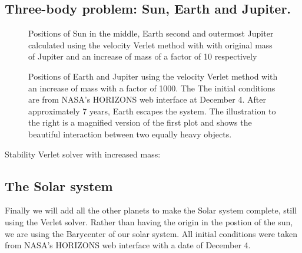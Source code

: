 \documentclass[../main.tex]{subfiles}
\begin{document}
\subsection{Three-body problem: Sun, Earth and Jupiter.}
\begin{figure}[!h]
  \centering
  \caption{Positions of Sun in the middle, Earth second and outermost Jupiter calculated using the velocity Verlet method with with original mass of Jupiter and an increase of mass of a factor of 10 respectively}
  \label{fig:SunEarthJupiter10}
\end{figure}

\begin{figure}[!h]
  \centering
  \caption{Positions of Earth and Jupiter using the velocity Verlet method with an increase of mass with a factor of 1000. The The initial conditions are from NASA's HORIZONS web interface at December 4. After approximately 7 years, Earth escapes the system. The illustration to the right is a magnified version of the first plot and shows the beautiful interaction between two equally heavy objects.}
  \label{fig:SunEarthJupiter10000}
\end{figure}
\FloatBarrier
Stability Verlet solver with increased mass:



\subsection{The Solar system}
Finally we will add all the other planets to make the Solar system complete, still using the Verlet solver. Rather than having the origin in the postion of the sun, we are using the Barycenter of our solar system. All initial conditions were taken from NASA's HORIZONS web interface\cite{HorizonsNASA} with a date of December 4.
\end{document}

